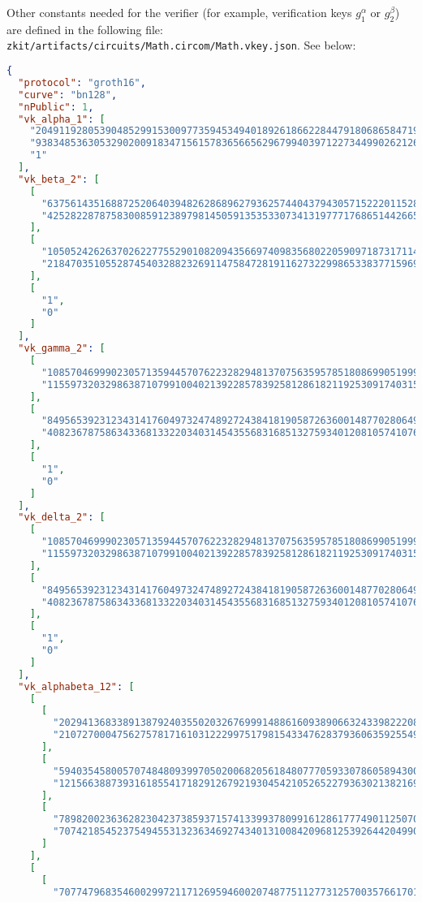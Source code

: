\documentclass[../lecture-notes.tex]{subfiles}
\begin{document}
    Other constants needed for the verifier (for example, verification keys $g_1^{\alpha}$ or $g_2^{\beta}$) are defined in the following file: \texttt{zkit/artifacts/circuits/Math.circom/Math.vkey.json}. See below:
    \begin{lstlisting}[language=JSON,numbers=none,basicstyle=\footnotesize\ttfamily\tiny]
{
  "protocol": "groth16",
  "curve": "bn128",
  "nPublic": 1,
  "vk_alpha_1": [
    "20491192805390485299153009773594534940189261866228447918068658471970481763042",
    "9383485363053290200918347156157836566562967994039712273449902621266178545958",
    "1"
  ],
  "vk_beta_2": [
    [
      "6375614351688725206403948262868962793625744043794305715222011528459656738731",
      "4252822878758300859123897981450591353533073413197771768651442665752259397132"
    ],
    [
      "10505242626370262277552901082094356697409835680220590971873171140371331206856",
      "21847035105528745403288232691147584728191162732299865338377159692350059136679"
    ],
    [
      "1",
      "0"
    ]
  ],
  "vk_gamma_2": [
    [
      "10857046999023057135944570762232829481370756359578518086990519993285655852781",
      "11559732032986387107991004021392285783925812861821192530917403151452391805634"
    ],
    [
      "8495653923123431417604973247489272438418190587263600148770280649306958101930",
      "4082367875863433681332203403145435568316851327593401208105741076214120093531"
    ],
    [
      "1",
      "0"
    ]
  ],
  "vk_delta_2": [
    [
      "10857046999023057135944570762232829481370756359578518086990519993285655852781",
      "11559732032986387107991004021392285783925812861821192530917403151452391805634"
    ],
    [
      "8495653923123431417604973247489272438418190587263600148770280649306958101930",
      "4082367875863433681332203403145435568316851327593401208105741076214120093531"
    ],
    [
      "1",
      "0"
    ]
  ],
  "vk_alphabeta_12": [
    [
      [
        "2029413683389138792403550203267699914886160938906632433982220835551125967885",
        "21072700047562757817161031222997517981543347628379360635925549008442030252106"
      ],
      [
        "5940354580057074848093997050200682056184807770593307860589430076672439820312",
        "12156638873931618554171829126792193045421052652279363021382169897324752428276"
      ],
      [
        "7898200236362823042373859371574133993780991612861777490112507062703164551277",
        "7074218545237549455313236346927434013100842096812539264420499035217050630853"
      ]
    ],
    [
      [
        "7077479683546002997211712695946002074877511277312570035766170199895071832130",

\end{lstlisting}
\end{document}

